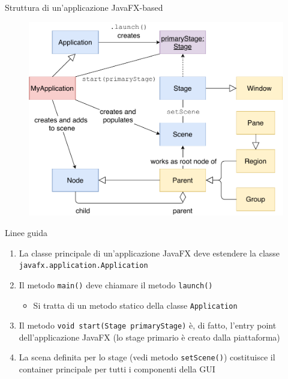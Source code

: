\documentclass[presentation]{beamer}
\begin{document}
%

\begin{frame}{Struttura di un'applicazione JavaFX-based}
\begin{figure}
\includegraphics[height=0.86\textheight]{img/javafx-app-structure.pdf}
\end{figure}
\end{frame}

\begin{frame}{Linee guida}
\begin{enumerate}\itemsep20pt
\item La classe principale di un'applicazione JavaFX deve estendere la classe \texttt{javafx.application.Application}
\item Il metodo \texttt{main()} deve chiamare il metodo \texttt{launch()}
\begin{itemize}
\item Si tratta di un metodo statico della classe \texttt{Application}
\end{itemize}
\item Il metodo \texttt{void start(Stage primaryStage)} è, di fatto, l'entry point dell'applicazione JavaFX (lo stage primario è creato dalla piattaforma)
\item La scena definita per lo stage (vedi metodo \texttt{setScene()}) costituisce il container principale per tutti i componenti della GUI
\end{enumerate}
\end{frame}
\end{document}
